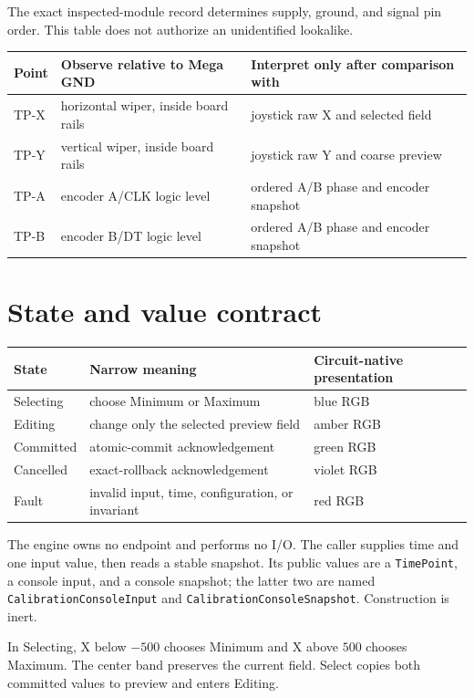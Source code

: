 \documentclass[11pt]{article}
\begin{document}
The exact inspected-module record determines supply, ground, and signal pin
order. This table does not authorize an unidentified lookalike.

\begin{tabularx}{\linewidth}{@{}l X X@{}}
\toprule
Point & Observe relative to Mega GND & Interpret only after comparison with\\
\midrule
TP-X & horizontal wiper, inside board rails & joystick raw X and selected field\\
TP-Y & vertical wiper, inside board rails & joystick raw Y and coarse preview\\
TP-A & encoder A/CLK logic level & ordered A/B phase and encoder snapshot\\
TP-B & encoder B/DT logic level & ordered A/B phase and encoder snapshot\\
\bottomrule
\end{tabularx}

\section{State and value contract}

\begin{tabularx}{\linewidth}{@{}l X X@{}}
\toprule
State & Narrow meaning & Circuit-native presentation\\
\midrule
Selecting & choose Minimum or Maximum & blue RGB\\
Editing & change only the selected preview field & amber RGB\\
Committed & atomic-commit acknowledgement & green RGB\\
Cancelled & exact-rollback acknowledgement & violet RGB\\
Fault & invalid input, time, configuration, or invariant & red RGB\\
\bottomrule
\end{tabularx}

The engine owns no endpoint and performs no I/O. The caller supplies time and
one input value, then reads a stable snapshot. Its public values are a
\texttt{TimePoint}, a console input, and a console snapshot; the latter two
are named \texttt{CalibrationConsoleInput} and
\texttt{CalibrationConsoleSnapshot}. Construction is inert.

In Selecting, X below \(-500\) chooses Minimum and X above \(500\) chooses
Maximum. The center band preserves the current field. Select copies both
committed values to preview and enters Editing.
\end{document}

